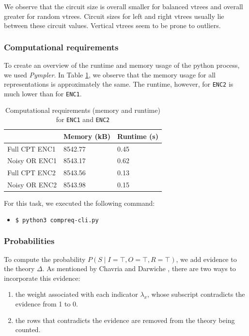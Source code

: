 \documentclass{article}
\begin{document}
We observe that the circuit size is overall smaller for balanced vtrees and overall greater for random vtrees. Circuit sizes for left and right  vtrees usually lie between these circuit values. Vertical vtrees seem to be prone to outliers.

\newpage

\subsubsection{Computational requirements}
To create an overview of the runtime and memory usage of the python process, we used \textit{Pympler}. In Table \ref{tab:memory_runtime}, we observe that the memory usage for all representations is approximately the same. The runtime, however, for \texttt{ENC2} is much lower than for \texttt{ENC1}.

\begin{table}[h]
\centering
\begin{tabular}{l | l l}
					&	Memory (kB)	&	Runtime (s)	\\\hline
	Full CPT ENC1	&	8542.77		&	0.45			\\
	Noisy OR ENC1	&	8543.17		&	0.62			\\
	Full CPT ENC2	&	8543.56		&	0.13			\\
	Noisy OR ENC2	&	8543.98		&	0.15			\\
\end{tabular}
\caption{Computational requirements (memory and runtime) for \texttt{ENC1} and \texttt{ENC2}}
\label{tab:memory_runtime}
\end{table}

For this task, we executed the following command:
\begin{itemize}
	\item[] \texttt{\$ python3 compreq-cli.py}
\end{itemize}

\subsubsection{Probabilities}
To compute the probability $P(S \mid I=\top, O = \top, R = \top)$, we add evidence to the theory $\Delta$. As mentioned by Chavria and Darwiche \cite{chavira}, there are two ways to incorporate this evidence:
\begin{enumerate}
	\item the weight associated with each indicator $\lambda_x$, whose subscript contradicts the evidence from 1 to 0.
	\item the rows that contradicts the evidence are removed from the theory being counted.
\end{enumerate}
\end{document}
